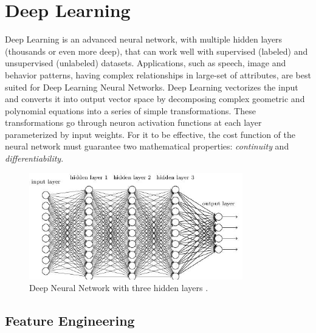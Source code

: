 \documentclass[sigconf]{acmart}
\begin{document}
	\section{Deep Learning}
	
	Deep Learning is an advanced neural network, with multiple hidden layers (thousands or even more deep), that can work well with supervised (labeled) and unsupervised (unlabeled) datasets. Applications, such as speech, image and behavior patterns, having complex relationships in large-set of attributes, are best suited for Deep Learning Neural Networks. Deep Learning vectorizes the input and converts it into output vector space by decomposing complex geometric and polynomial equations into a series of simple transformations. These transformations go through neuron activation functions at each layer parameterized by input weights. For it to be effective, the cost function of the neural network must guarantee two mathematical properties: {\em continuity} and {\em differentiability}.
	
	\begin{figure}
		\centering
		\includegraphics[width=1.0\columnwidth]{images/deepnetwork}
		\caption{Deep Neural Network with three hidden layers \cite{Goodfellow2016}.} \label{fig:figure2} 
	\end{figure}

	\subsection{Feature Engineering}
	
\end{document}
